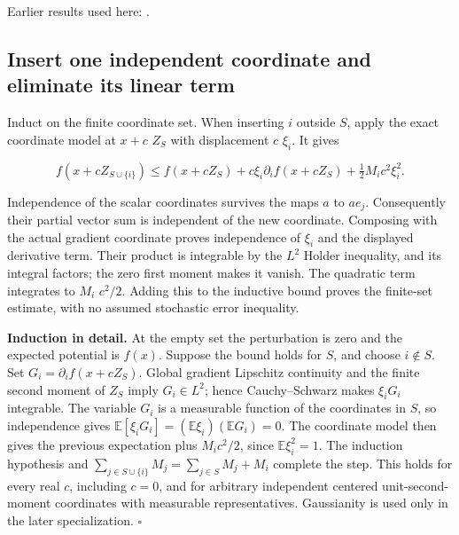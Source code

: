 \documentclass[11pt,a4paper]{report}
\begin{document}
Earlier results used here: \cite[Section~3.13.4]{LangevinLean2026ULASC}.
\subsection{\texorpdfstring{Insert one independent coordinate and eliminate its linear term}{Insert one independent coordinate and eliminate its linear term}}
\label{report-step-AverageLMC-Smoothing-lean-2}


Induct on the finite coordinate set. When inserting \(i\) outside \(S\), apply the exact coordinate model at \(x+c\) \(Z_S\) with displacement \(c\) \(\xi_i\). It gives

\[f(x+cZ_{S\cup\{i\}})\le f(x+cZ_S)+c\xi_i\partial_i f(x+cZ_S)+\tfrac12 M_i c^2\xi_i^2.\]

Independence of the scalar coordinates survives the maps \(a\) to \(ae_j\). Consequently their partial vector sum is independent of the new coordinate. Composing with the actual gradient coordinate proves independence of \(\xi_i\) and the displayed derivative term. Their product is integrable by the \(L^{2}\) Holder inequality, and its integral factors; the zero first moment makes it vanish. The quadratic term integrates to \(M_i\) \(c^2/2\). Adding this to the inductive bound proves the finite-set estimate, with no assumed stochastic error inequality.




\textbf{Induction in detail.} At the empty set the perturbation is zero and the expected potential is \(f(x)\). Suppose the bound holds for \(S\), and choose \(i\notin S\). Set \(G_i=\partial_i f(x+cZ_S)\). Global gradient Lipschitz continuity and the finite second moment of \(Z_S\) imply \(G_i\in L^2\); hence Cauchy–Schwarz makes \(\xi_iG_i\) integrable. The variable \(G_i\) is a measurable function of the coordinates in \(S\), so independence gives \(\mathbb E[\xi_iG_i]=(\mathbb E\xi_i)(\mathbb EG_i)=0\). The coordinate model then gives the previous expectation plus \(M_ic^2/2\), since \(\mathbb E\xi_i^2=1\). The induction hypothesis and \(\sum_{j\in S\cup\{i\}}M_j=\sum_{j\in S}M_j+M_i\) complete the step. This holds for every real \(c\), including \(c=0\), and for arbitrary independent centered unit-second-moment coordinates with measurable representatives. Gaussianity is used only in the later specialization. \(\square\)
\end{document}

